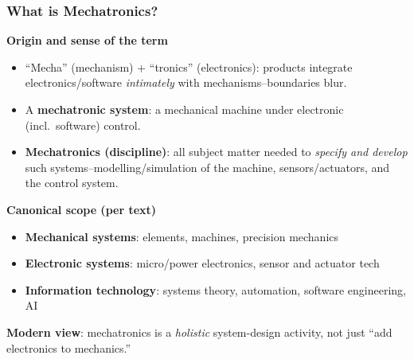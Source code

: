 \begin{frame}
	\frametitle{What is Mechatronics?}
  \textbf{Origin and sense of the term}
  \begin{itemize}
    \item “Mecha” (mechanism) + “tronics” (electronics): products integrate electronics/software \emph{intimately} with mechanisms--boundaries blur.
    \item A \textbf{mechatronic system}: a mechanical machine under electronic (incl.\ software) control.
    \item \textbf{Mechatronics (discipline)}: all subject matter needed to \emph{specify and develop} such systems--modelling/simulation of the machine, sensors/actuators, and the control system.
  \end{itemize}
  \textbf{Canonical scope (per text)}
  \begin{itemize}
    \item \textbf{Mechanical systems}: elements, machines, precision mechanics
    \item \textbf{Electronic systems}: micro/power electronics, sensor and actuator tech
    \item \textbf{Information technology}: systems theory, automation, software engineering, AI
  \end{itemize}
  \textbf{Modern view}: mechatronics is a \emph{holistic} system-design activity, not just “add electronics to mechanics.”
\end{frame}

